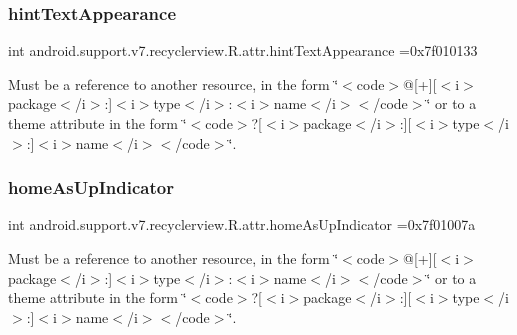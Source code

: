 \subsubsection{\texorpdfstring{hint\+Text\+Appearance}{hintTextAppearance}}
{\footnotesize\ttfamily int android.\+support.\+v7.\+recyclerview.\+R.\+attr.\+hint\+Text\+Appearance =0x7f010133\hspace{0.3cm}{\ttfamily [static]}}

Must be a reference to another resource, in the form \char`\"{}$<$code$>$@\mbox{[}+\mbox{]}\mbox{[}$<$i$>$package$<$/i$>$\+:\mbox{]}$<$i$>$type$<$/i$>$\+:$<$i$>$name$<$/i$>$$<$/code$>$\char`\"{} or to a theme attribute in the form \char`\"{}$<$code$>$?\mbox{[}$<$i$>$package$<$/i$>$\+:\mbox{]}\mbox{[}$<$i$>$type$<$/i$>$\+:\mbox{]}$<$i$>$name$<$/i$>$$<$/code$>$\char`\"{}. \mbox{\label{classandroid_1_1support_1_1v7_1_1recyclerview_1_1R_1_1attr_a68aeeb1562012b2325bdac6890d6ff08}} 
\subsubsection{\texorpdfstring{home\+As\+Up\+Indicator}{homeAsUpIndicator}}
{\footnotesize\ttfamily int android.\+support.\+v7.\+recyclerview.\+R.\+attr.\+home\+As\+Up\+Indicator =0x7f01007a\hspace{0.3cm}{\ttfamily [static]}}

Must be a reference to another resource, in the form \char`\"{}$<$code$>$@\mbox{[}+\mbox{]}\mbox{[}$<$i$>$package$<$/i$>$\+:\mbox{]}$<$i$>$type$<$/i$>$\+:$<$i$>$name$<$/i$>$$<$/code$>$\char`\"{} or to a theme attribute in the form \char`\"{}$<$code$>$?\mbox{[}$<$i$>$package$<$/i$>$\+:\mbox{]}\mbox{[}$<$i$>$type$<$/i$>$\+:\mbox{]}$<$i$>$name$<$/i$>$$<$/code$>$\char`\"{}. \mbox{\label{classandroid_1_1support_1_1v7_1_1recyclerview_1_1R_1_1attr_a321fa14b2fed06586e03b1d01d9c255a}} 
